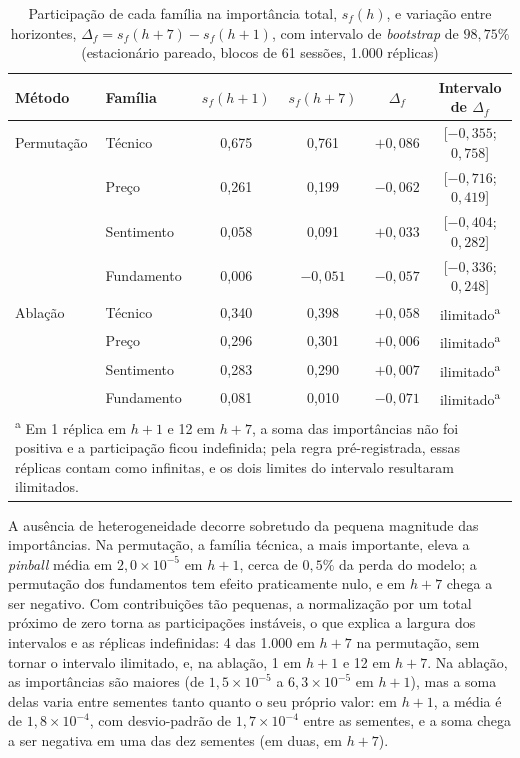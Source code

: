 \begin{table}[htb]
\centering
\caption[Participação de cada família e variação entre horizontes (H3)]{Participação de cada família na importância total, \(s_f(h)\), e variação entre horizontes, \(\Delta_f = s_f(h+7) - s_f(h+1)\), com intervalo de \textit{bootstrap} de \(98{,}75\%\) (estacionário pareado, blocos de 61 sessões, 1.000 réplicas)}
\label{tab:h3}
\small
\begin{tabular}{l l c c c c}
\toprule
Método & Família & \(s_f(h+1)\) & \(s_f(h+7)\) & \(\Delta_f\) & Intervalo de \(\Delta_f\) \\
\midrule
Permutação & Técnico & 0,675 & 0,761 & \(+0{,}086\) & [\(-0{,}355\); \(0{,}758\)] \\
 & Preço & 0,261 & 0,199 & \(-0{,}062\) & [\(-0{,}716\); \(0{,}419\)] \\
 & Sentimento & 0,058 & 0,091 & \(+0{,}033\) & [\(-0{,}404\); \(0{,}282\)] \\
 & Fundamento & 0,006 & \(-0{,}051\) & \(-0{,}057\) & [\(-0{,}336\); \(0{,}248\)] \\
\midrule
Ablação & Técnico & 0,340 & 0,398 & \(+0{,}058\) & ilimitado\textsuperscript{a} \\
 & Preço & 0,296 & 0,301 & \(+0{,}006\) & ilimitado\textsuperscript{a} \\
 & Sentimento & 0,283 & 0,290 & \(+0{,}007\) & ilimitado\textsuperscript{a} \\
 & Fundamento & 0,081 & 0,010 & \(-0{,}071\) & ilimitado\textsuperscript{a} \\
\bottomrule
\multicolumn{6}{p{14cm}}{\footnotesize \textsuperscript{a} Em 1 réplica em \(h+1\) e 12 em \(h+7\), a soma das importâncias não foi positiva e a participação ficou indefinida; pela regra pré-registrada, essas réplicas contam como infinitas, e os dois limites do intervalo resultaram ilimitados.}
\end{tabular}
\end{table}

A ausência de heterogeneidade decorre sobretudo da pequena magnitude das importâncias. Na permutação, a família técnica, a mais importante, eleva a \textit{pinball} média em \(2{,}0 \times 10^{-5}\) em \(h+1\), cerca de \(0{,}5\%\) da perda do modelo; a permutação dos fundamentos tem efeito praticamente nulo, e em \(h+7\) chega a ser negativo. Com contribuições tão pequenas, a normalização por um total próximo de zero torna as participações instáveis, o que explica a largura dos intervalos e as réplicas indefinidas: 4 das 1.000 em \(h+7\) na permutação, sem tornar o intervalo ilimitado, e, na ablação, 1 em \(h+1\) e 12 em \(h+7\). Na ablação, as importâncias são maiores (de \(1{,}5 \times 10^{-5}\) a \(6{,}3 \times 10^{-5}\) em \(h+1\)), mas a soma delas varia entre sementes tanto quanto o seu próprio valor: em \(h+1\), a média é de \(1{,}8 \times 10^{-4}\), com desvio-padrão de \(1{,}7 \times 10^{-4}\) entre as sementes, e a soma chega a ser negativa em uma das dez sementes (em duas, em \(h+7\)).

